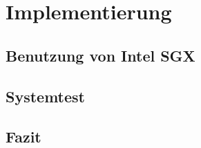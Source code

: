 
\chapter{Implementierung}

\section{Benutzung von Intel SGX}

\section{Systemtest}

\section{Fazit}

